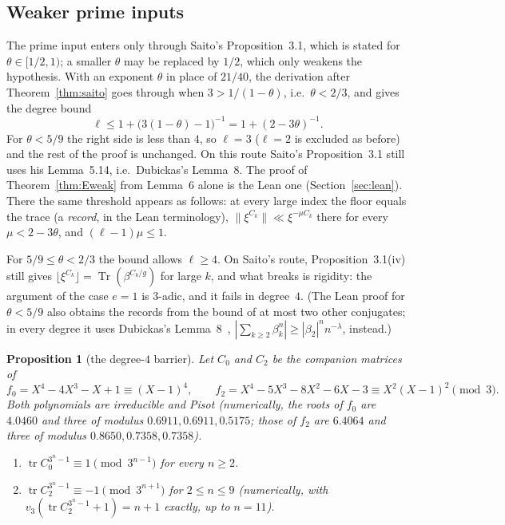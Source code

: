 \documentclass[11pt]{amsart}
\newtheorem{proposition}[theorem]{Proposition}
\theoremstyle{definition}
\newcommand{\tr}{\operatorname{tr}}
\newcommand{\Tr}{\operatorname{Tr}}
\newcommand{\floor}[1]{\lfloor #1 \rfloor}
\begin{document}
\subsection{Weaker prime inputs}\label{sec:Eweak}
The prime input enters only through Saito's Proposition~3.1, which is stated for $\theta\in[1/2,1)$; a smaller $\theta$ may be replaced by $1/2$, which only weakens the hypothesis.  With an exponent $\theta$ in place of $21/40$, the derivation after Theorem~\ref{thm:saito} goes through when $3>1/(1-\theta)$, i.e.\ $\theta<2/3$, and gives the degree bound
\[ \ell\le1+\big(3(1-\theta)-1\big)^{-1}=1+(2-3\theta)^{-1}. \]
For $\theta<5/9$ the right side is less than $4$, so $\ell=3$ ($\ell=2$ is excluded as before) and the rest of the proof is unchanged.  On this route Saito's Proposition~3.1 still uses his Lemma~5.14, i.e.\ Dubickas's Lemma~8.  The proof of Theorem~\ref{thm:Eweak} from Lemma~6 alone is the Lean one (Section~\ref{sec:lean}).  There the same threshold appears as follows: at every large index the floor equals the trace (a \emph{record}, in the Lean terminology), $\|\xi^{C_k}\|\ll\xi^{-\mu C_k}$ there for every $\mu<2-3\theta$, and $(\ell-1)\mu\le1$.

For $5/9\le\theta<2/3$ the bound allows $\ell\ge4$.  On Saito's route, Proposition~3.1(iv) still gives $\floor{\xi^{C_k}}=\Tr(\beta^{C_k/g})$ for large $k$, and what breaks is rigidity: the argument of the case $e=1$ is $3$-adic, and it fails in degree~$4$.  (The Lean proof for $\theta<5/9$ also obtains the records from the bound of at most two other conjugates; in every degree it uses Dubickas's Lemma~8~\cite{Dub22}, $|\sum_{k\ge2}\beta_k^n|\ge|\beta_2|^nn^{-\lambda}$, instead.)

\begin{proposition}[the degree-$4$ barrier]\label{prop:barrier}
Let $C_0$ and $C_2$ be the companion matrices of
\[ f_0=X^4-4X^3-X+1\equiv(X-1)^4,\qquad f_2=X^4-5X^3-8X^2-6X-3\equiv X^2(X-1)^2\pmod 3. \]
Both polynomials are irreducible and Pisot (numerically, the roots of $f_0$ are $4.0460$ and three of modulus $0.6911,0.6911,0.5175$; those of $f_2$ are $6.4064$ and three of modulus $0.8650,0.7358,0.7358$).
\begin{enumerate}
\item $\tr C_0^{3^n-1}\equiv1\pmod{3^{n-1}}$ for every $n\ge2$.
\item $\tr C_2^{3^n-1}\equiv-1\pmod{3^{n+1}}$ for $2\le n\le 9$ (numerically, with $v_3(\tr C_2^{3^n-1}+1)=n+1$ exactly, up to $n=11$).
\end{enumerate}
\end{proposition}
\end{document}
